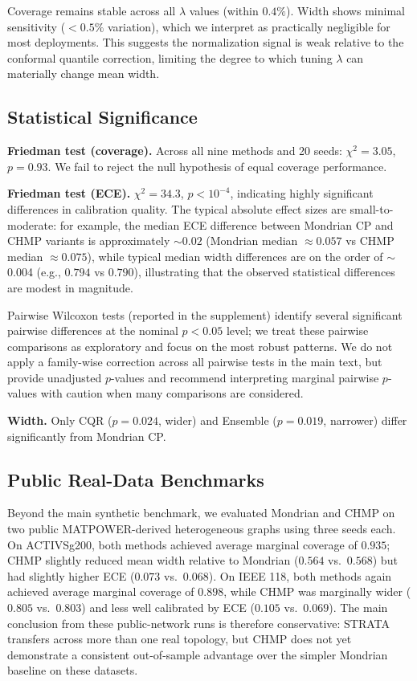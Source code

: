 \documentclass[twoside,11pt]{article}
\begin{document}
Coverage remains stable across all $\lambda$ values (within $0.4\%$). Width
shows minimal sensitivity ($<0.5\%$ variation), which we interpret as
practically negligible for most deployments. This suggests the normalization
signal is weak relative to the conformal quantile correction, limiting the
degree to which tuning $\lambda$ can materially change mean width.

\subsection{Statistical Significance}

\textbf{Friedman test (coverage).} Across all nine methods and 20 seeds:
$\chi^2 = 3.05$, $p = 0.93$. We fail to reject the null hypothesis of equal
coverage performance.

\textbf{Friedman test (ECE).} $\chi^2 = 34.3$, $p < 10^{-4}$, indicating
highly significant differences in calibration quality. The typical absolute
effect sizes are small-to-moderate: for example, the median ECE difference
between Mondrian CP and CHMP variants is approximately $\sim0.02$ (Mondrian
median $\approx0.057$ vs CHMP median $\approx0.075$), while typical median
width differences are on the order of $\sim$0.004 (e.g., $0.794$ vs $0.790$),
illustrating that the observed statistical differences are modest in magnitude.

Pairwise Wilcoxon tests (reported in the supplement) identify several
significant pairwise differences at the nominal $p<0.05$ level; we treat these
pairwise comparisons as exploratory and focus on the most robust patterns.
We do not apply a family-wise correction across all pairwise tests in the main
text, but provide unadjusted $p$-values and recommend interpreting marginal
pairwise $p$-values with caution when many comparisons are considered.

\textbf{Width.} Only CQR ($p = 0.024$, wider) and Ensemble ($p = 0.019$,
narrower) differ significantly from Mondrian CP.

\subsection{Public Real-Data Benchmarks}

Beyond the main synthetic benchmark, we evaluated Mondrian and CHMP on two public
MATPOWER-derived heterogeneous graphs using three seeds each. On ACTIVSg200, both
methods achieved average marginal coverage of $0.935$; CHMP slightly reduced mean
width relative to Mondrian ($0.564$ vs.\ $0.568$) but had slightly higher ECE
($0.073$ vs.\ $0.068$). On IEEE 118, both methods again achieved average marginal
coverage of $0.898$, while CHMP was marginally wider ($0.805$ vs.\ $0.803$) and
less well calibrated by ECE ($0.105$ vs.\ $0.069$). The main conclusion from these
public-network runs is therefore conservative: STRATA transfers across more than
one real topology, but CHMP does not yet demonstrate a consistent out-of-sample
advantage over the simpler Mondrian baseline on these datasets.
\end{document}
